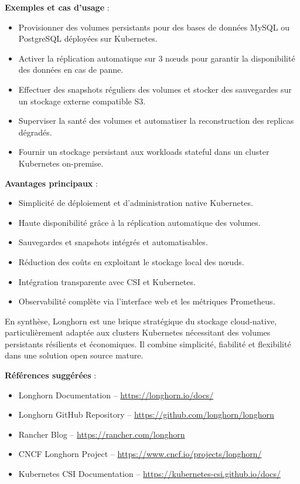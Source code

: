 \textbf{Exemples et cas d’usage} :
\begin{itemize}
	\item Provisionner des volumes persistants pour des bases de données MySQL ou PostgreSQL déployées sur Kubernetes.
	\item Activer la réplication automatique sur 3 nœuds pour garantir la disponibilité des données en cas de panne.
	\item Effectuer des snapshots réguliers des volumes et stocker des sauvegardes sur un stockage externe compatible S3.
	\item Superviser la santé des volumes et automatiser la reconstruction des replicas dégradés.
	\item Fournir un stockage persistant aux workloads stateful dans un cluster Kubernetes on-premise.
\end{itemize}

\textbf{Avantages principaux} :
\begin{itemize}
	\item Simplicité de déploiement et d’administration native Kubernetes.
	\item Haute disponibilité grâce à la réplication automatique des volumes.
	\item Sauvegardes et snapshots intégrés et automatisables.
	\item Réduction des coûts en exploitant le stockage local des nœuds.
	\item Intégration transparente avec CSI et Kubernetes.
	\item Observabilité complète via l’interface web et les métriques Prometheus.
\end{itemize}

En synthèse, Longhorn est une brique stratégique du stockage cloud-native, particulièrement adaptée aux clusters Kubernetes nécessitant des volumes persistants résilients et économiques. Il combine simplicité, fiabilité et flexibilité dans une solution open source mature.

\textbf{Références suggérées} :
\begin{itemize}
	\item Longhorn Documentation – \url{https://longhorn.io/docs/}
	\item Longhorn GitHub Repository – \url{https://github.com/longhorn/longhorn}
	\item Rancher Blog – \url{https://rancher.com/longhorn}
	\item CNCF Longhorn Project – \url{https://www.cncf.io/projects/longhorn/}
	\item Kubernetes CSI Documentation – \url{https://kubernetes-csi.github.io/docs/}
\end{itemize}

